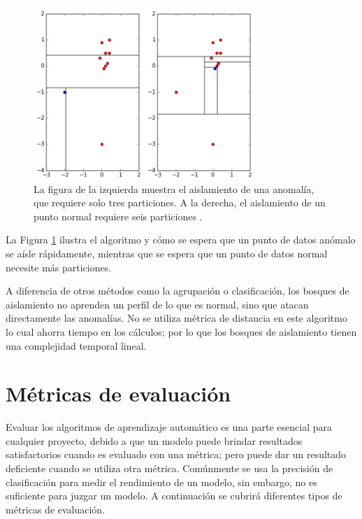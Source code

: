 \begin{figure}[h!]
  \begin{center}	\includegraphics[width=0.75\textwidth]{imagenes/Cap4/isolation-forest}
  \caption{La figura de la izquierda muestra el aislamiento de una anomalía, que requiere solo tres particiones. A la derecha, el aislamiento de un punto normal requiere seis particiones \cite{60}.} 
  \label{fig:isolartion-forest}
  \end{center}
\end{figure}

\vspace{5mm} %

La Figura \ref{fig:isolartion-forest} ilustra el algoritmo y cómo se espera que un punto de datos anómalo se aísle rápidamente, mientras que se espera que un punto de datos normal necesite más particiones.

\vspace{5mm} %

A diferencia de otros métodos como la agrupación o clasificación, los bosques de aislamiento no aprenden un perfil de lo que es normal, sino que atacan directamente las anomalías. No se utiliza métrica de distancia en este algoritmo lo cual ahorra tiempo en los cálculos; por lo que los bosques de aislamiento tienen una complejidad temporal lineal. 

\section{M\'{e}tricas de evaluaci\'{o}n}

Evaluar los algoritmos de aprendizaje autom\'{a}tico es una parte esencial para cualquier proyecto, debido a que un modelo puede brindar resultados satisfactorios cuando es evaluado con una m\'{e}trica; pero puede dar un resultado deficiente cuando se utiliza otra m\'{e}trica. Com\'{u}nmente se usa la precisi\'{o}n de clasificaci\'{o}n para medir el rendimiento de un modelo, sin embargo, no es suficiente para juzgar un modelo. A continuaci\'{o}n se cubrir\'{a} diferentes tipos de m\'{e}tricas de evaluaci\'{o}n.

